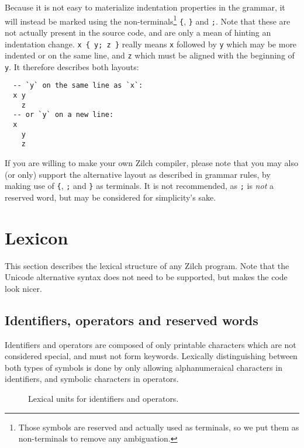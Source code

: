\noindent Because it is not easy to materialize indentation properties in the grammar, it will instead be marked using the non-terminals\footnote{Those symbols are reserved and actually used as terminals, so we put them as non-terminals to remove any ambiguation.} \texttt{\{}, \texttt{\}} and \texttt{;}.
Note that these are not actually present in the source code, and are only a mean of hinting an indentation change.
\texttt{x \{ y; z \}} really means \texttt{x} followed by \texttt{y} which may be more indented or on the same line, and \texttt{z} which must be aligned with the beginning of \texttt{y}.
It therefore describes both layouts:

\noindent\begin{verbatim}
  -- `y` on the same line as `x`:
  x y
    z
  -- or `y` on a new line:
  x
    y
    z
\end{verbatim}
\vspace*{\baselineskip}

If you are willing to make your own Zilch compiler, please note that you may also (or only) support the alternative layout as described in grammar rules, by making use of \verb|{|, \verb|;| and \verb|}| as terminals.
It is not recommended, as \verb|;| is \textit{not} a reserved word, but may be considered for simplicity's sake.

\section{Lexicon}\label{sec:zilch-grammar-lexical}

This section describes the lexical structure of any Zilch program.
Note that the Unicode alternative syntax does not need to be supported, but makes the code look nicer.

\subsection{Identifiers, operators and reserved words}\label{subsec:zilch-grammar-lexical-identifiers}

Identifiers and operators are composed of only printable characters which are not considered special, and must not form keywords.
Lexically distinguishing between both types of symbols is done by only allowing alphanumeraical characters in identifiers, and symbolic characters in operators.

\begin{figure}[H]
	\centering


	\caption{Lexical units for identifiers and operators.}
	\label{fig:zilch-grammar-lexical-identifiers-grammar}
\end{figure}

